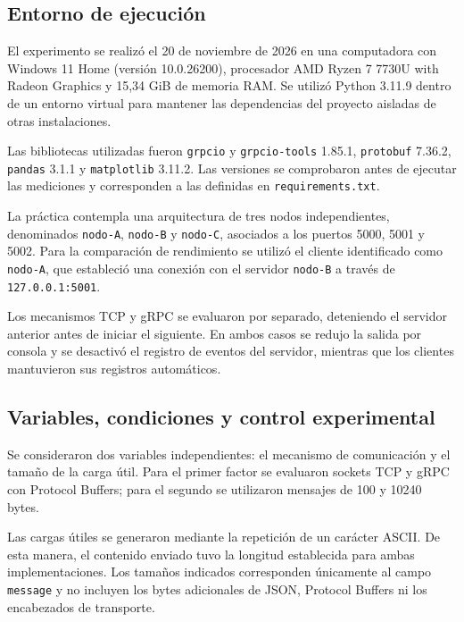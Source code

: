 

\subsection{Entorno de ejecución}

El experimento se realizó el 20 de noviembre de 2026 en una computadora con Windows 11 Home
(versión 10.0.26200), procesador AMD Ryzen 7 7730U with Radeon Graphics y 15,34 GiB de
memoria RAM. Se utilizó Python 3.11.9 dentro de un entorno virtual para mantener las
dependencias del proyecto aisladas de otras instalaciones.

Las bibliotecas utilizadas fueron
\texttt{grpcio} y \texttt{grpcio-tools} 1.85.1,
\texttt{protobuf} 7.36.2, \texttt{pandas} 3.1.1
y \texttt{matplotlib} 3.11.2. Las versiones se
comprobaron antes de ejecutar las mediciones y
corresponden a las definidas en
\texttt{requirements.txt}.

La práctica contempla una arquitectura de tres
nodos independientes, denominados
\texttt{nodo-A}, \texttt{nodo-B} y
\texttt{nodo-C}, asociados a los puertos
5000, 5001 y 5002. Para la comparación de
rendimiento se utilizó el cliente identificado
como \texttt{nodo-A}, que estableció una
conexión con el servidor \texttt{nodo-B}
a través de \texttt{127.0.0.1:5001}.

Los mecanismos TCP y gRPC se evaluaron por separado, deteniendo el servidor anterior
antes de iniciar el siguiente. En ambos casos se redujo la salida por consola y
se desactivó el registro de eventos del servidor, mientras que los clientes
mantuvieron sus registros automáticos.

\subsection{Variables, condiciones y control experimental}

Se consideraron dos variables independientes: el mecanismo de comunicación y el tamaño de
la carga útil. Para el primer factor se evaluaron sockets TCP y gRPC con Protocol
Buffers; para el segundo se utilizaron mensajes de 100 y 10240 bytes.

Las cargas útiles se generaron mediante la repetición de un carácter ASCII. De esta
manera, el contenido enviado tuvo la longitud establecida para ambas
implementaciones. Los tamaños indicados corresponden únicamente al campo
\texttt{message} y no incluyen los bytes adicionales de JSON, Protocol Buffers ni
los encabezados de transporte.

